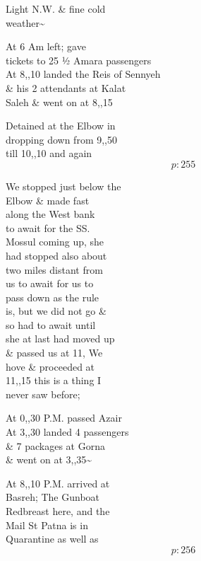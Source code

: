 \documentclass{report}
\begin{document}
	\par{
 	Light N.W. \& fine cold\ \\weather\~{}\ \\
	}

	\par{
 	At 6 Am left; gave\ \\tickets to 25 ½ Amara passengers\ \\At 8,,10 landed the Reis of Sennyeh\ \\\& his 2 attendants at Kalat\ \\Saleh \& went on at 8,,15\ \\
	}

	\par{
 	Detained at the Elbow in\ \\dropping down from 9,,50\ \\till 10,,10 and again\ \\
  \[p: 255 \]

	}


	\par{
 	We stopped just below the\ \\Elbow \& made fast\ \\along the West bank\ \\to await for the SS.\ \\Mossul coming up, she\ \\had stopped also about\ \\two miles distant from\ \\us to await for us to\ \\pass down as the rule\ \\is, but we did not go \&\ \\so had to await until\ \\she at last had moved up\ \\\& passed us at 11, We\ \\hove \& proceeded at\ \\11,,15 this is a thing I\ \\never saw before;\ \\
	}

	\par{
 	At 0,,30 P.M. passed Azair\ \\At 3,,30 landed 4 passengers\ \\\& 7 packages at Gorna\ \\\& went on at 3,,35\~{}\ \\
	}

	\par{
 	At 8,,10 P.M. arrived at\ \\Basreh; The Gunboat\ \\Redbreast here, and the\ \\Mail St Patna is in\ \\Quarantine as well as\ \\
  \[p: 256 \]

	}
\end{document}
